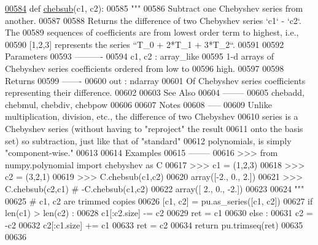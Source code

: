 \begin{DoxyCode}
\hypertarget{namespacepyneb_1_1utils_1_1chebyshev_l00584}{}\hyperlink{namespacepyneb_1_1utils_1_1chebyshev_ac07c70b217882a8c0a731ce9fdf743f0}{00584} \textcolor{keyword}{def }\hyperlink{namespacepyneb_1_1utils_1_1chebyshev_ac07c70b217882a8c0a731ce9fdf743f0}{chebsub}(c1, c2):
00585     \textcolor{stringliteral}{"""}
00586 \textcolor{stringliteral}{    Subtract one Chebyshev series from another.}
00587 \textcolor{stringliteral}{}
00588 \textcolor{stringliteral}{    Returns the difference of two Chebyshev series `c1` - `c2`.  The}
00589 \textcolor{stringliteral}{    sequences of coefficients are from lowest order term to highest, i.e.,}
00590 \textcolor{stringliteral}{    [1,2,3] represents the series ``T\_0 + 2*T\_1 + 3*T\_2``.}
00591 \textcolor{stringliteral}{}
00592 \textcolor{stringliteral}{    Parameters}
00593 \textcolor{stringliteral}{    ----------}
00594 \textcolor{stringliteral}{    c1, c2 : array\_like}
00595 \textcolor{stringliteral}{        1-d arrays of Chebyshev series coefficients ordered from low to}
00596 \textcolor{stringliteral}{        high.}
00597 \textcolor{stringliteral}{}
00598 \textcolor{stringliteral}{    Returns}
00599 \textcolor{stringliteral}{    -------}
00600 \textcolor{stringliteral}{    out : ndarray}
00601 \textcolor{stringliteral}{        Of Chebyshev series coefficients representing their difference.}
00602 \textcolor{stringliteral}{}
00603 \textcolor{stringliteral}{    See Also}
00604 \textcolor{stringliteral}{    --------}
00605 \textcolor{stringliteral}{    chebadd, chebmul, chebdiv, chebpow}
00606 \textcolor{stringliteral}{}
00607 \textcolor{stringliteral}{    Notes}
00608 \textcolor{stringliteral}{    -----}
00609 \textcolor{stringliteral}{    Unlike multiplication, division, etc., the difference of two Chebyshev}
00610 \textcolor{stringliteral}{    series is a Chebyshev series (without having to "reproject" the result}
00611 \textcolor{stringliteral}{    onto the basis set) so subtraction, just like that of "standard"}
00612 \textcolor{stringliteral}{    polynomials, is simply "component-wise."}
00613 \textcolor{stringliteral}{}
00614 \textcolor{stringliteral}{    Examples}
00615 \textcolor{stringliteral}{    --------}
00616 \textcolor{stringliteral}{    >>> from numpy.polynomial import chebyshev as C}
00617 \textcolor{stringliteral}{    >>> c1 = (1,2,3)}
00618 \textcolor{stringliteral}{    >>> c2 = (3,2,1)}
00619 \textcolor{stringliteral}{    >>> C.chebsub(c1,c2)}
00620 \textcolor{stringliteral}{    array([-2.,  0.,  2.])}
00621 \textcolor{stringliteral}{    >>> C.chebsub(c2,c1) # -C.chebsub(c1,c2)}
00622 \textcolor{stringliteral}{    array([ 2.,  0., -2.])}
00623 \textcolor{stringliteral}{}
00624 \textcolor{stringliteral}{    """}
00625     \textcolor{comment}{# c1, c2 are trimmed copies}
00626     [c1, c2] = pu.as\_series([c1, c2])
00627     \textcolor{keywordflow}{if} len(c1) > len(c2) :
00628         c1[:c2.size] -= c2
00629         ret = c1
00630     \textcolor{keywordflow}{else} :
00631         c2 = -c2
00632         c2[:c1.size] += c1
00633         ret = c2
00634     \textcolor{keywordflow}{return} pu.trimseq(ret)
00635 
00636 
\end{DoxyCode}
